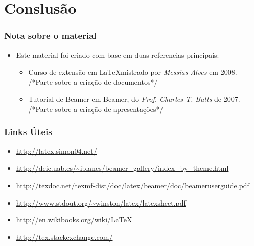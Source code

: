 \section{Conslusão}

\begin{frame}
\frametitle{Nota sobre o material} 

\begin{itemize}
  \item Este material foi criado com base em duas referencias principais:
  \begin{itemize}
		\item Curso de extensão em \LaTeX mistrado por \textit{Messias Alves} em 2008.
    {\color{darkcerulean} /*Parte sobre a criação de documentos*/}
		\item Tutorial de Beamer em Beamer, do \textit{Prof. Charles T. Batts} de
		2007. {\color{darkcerulean} /*Parte sobre a criação de apresentações*/}
  \end{itemize}
\end{itemize}
\end{frame}


\begin{frame}
\frametitle{Links Úteis} 

\begin{itemize}
  \item \url{http://latex.simon04.net/}
  \item \url{http://deic.uab.es/~iblanes/beamer_gallery/index_by_theme.html}
  \item \url{http://texdoc.net/texmf-dist/doc/latex/beamer/doc/beameruserguide.pdf}
  \item \url{http://www.stdout.org/~winston/latex/latexsheet.pdf}
  \item \url{http://en.wikibooks.org/wiki/LaTeX}
  \item {\Large \color{darkcerulean} \url{http://tex.stackexchange.com/}}
\end{itemize}
\end{frame}


